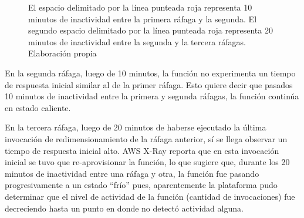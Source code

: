 \begin{figure}[h]
\hspace{-1.0cm}
\caption[\hspace{0.2cm} 4 ráfagas de 100 invocaciones de redimensionamiento en imágenes $\leq 500Kb$]{El espacio delimitado por la línea punteada roja representa 10 minutos de inactividad entre la primera ráfaga y la segunda. El segundo espacio delimitado por la línea punteada roja representa 20 minutos de inactividad entre la segunda y la tercera ráfagas. Elaboración propia}
\label{fig:rafagas-hasta-500kb}
\end{figure}

En la segunda ráfaga, luego de 10 minutos, la función no experimenta un tiempo de respuesta inicial similar al de la primer ráfaga. Esto quiere decir que pasados 10 minutos de inactividad entre la primera y segunda ráfagas, la función continúa en estado caliente.

En la tercera ráfaga, luego de 20 minutos de haberse ejecutado la última invocación de redimensionamiento de la ráfaga anterior, sí se llega observar un tiempo de respuesta inicial alto. AWS X-Ray reporta que en esta invocación inicial se tuvo que re-aprovisionar la función, lo que sugiere que, durante los 20 minutos de inactividad entre una ráfaga y otra, la función fue pasando progresivamente a un estado ``frío'' pues, aparentemente la plataforma pudo determinar que el nivel de actividad de la función (cantidad de invocaciones) fue decreciendo hasta un punto en donde no detectó actividad alguna.

